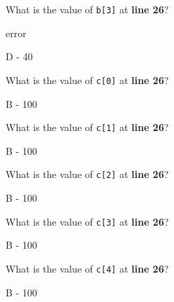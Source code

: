 \documentclass[11pt,answers]{exam}
\begin{document}
\begin{questions}
\question[1] What is the value of {\tt b[3]} at {\bf line 26}? \newline
\begin{oneparchoices}
	    \choice error
\end{oneparchoices}
\begin{solution} D - 40 \end{solution}

\makebox[4in]{\hrulefill}

\question[1] What is the value of {\tt c[0]} at {\bf line 26}? \newline
\begin{oneparchoices}
	    
\end{oneparchoices}
\begin{solution} B - 100 \end{solution}

\question[1] What is the value of {\tt c[1]} at {\bf line 26}? \newline
\begin{oneparchoices}
	    
\end{oneparchoices}
\begin{solution} B - 100 \end{solution}

\question[1] What is the value of {\tt c[2]} at {\bf line 26}? \newline
\begin{oneparchoices}
	    
\end{oneparchoices}
\begin{solution} B - 100 \end{solution}

\question[1] What is the value of {\tt c[3]} at {\bf line 26}? \newline
\begin{oneparchoices}
	    
\end{oneparchoices}
\begin{solution} B - 100 \end{solution}

\question[1] What is the value of {\tt c[4]} at {\bf line 26}? \newline
\begin{oneparchoices}
	    
\end{oneparchoices}
\begin{solution} B - 100 \end{solution}



\end{questions}
\end{document}
